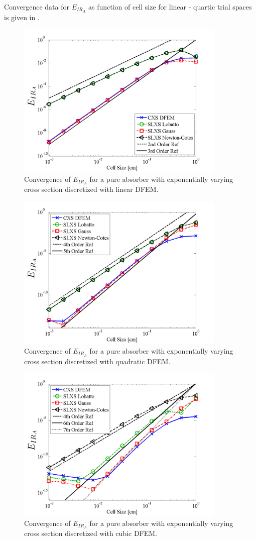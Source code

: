 Convergence data for $E_{IR_A}$ as function of cell size for linear - quartic trial spaces is given in .
%
\begin{figure}[!htp]
\centering
\includegraphics[width=10cm]{chapter3_variable_xs/P1_VarXS_E_I_A.png}
\caption{Convergence of $E_{IR_A}$ for a pure absorber with exponentially varying cross section discretized with linear DFEM.}
\label{fig:varxs_I_A_p1}
\end{figure}
%
%
\begin{figure}[!hbp]
\centering
\includegraphics[width=10cm]{chapter3_variable_xs/P2_VarXS_E_I_A.png}
\caption{Convergence of $E_{IR_A}$ for a pure absorber with exponentially varying cross section discretized with quadratic DFEM.}
\label{fig:varxs_I_A_p2}
\end{figure}
%
\begin{figure}[!htp]
\centering
\includegraphics[width=10cm]{chapter3_variable_xs/P3_VarXS_E_I_A.png}
\caption{Convergence of $E_{IR_A}$ for a pure absorber with exponentially varying cross section discretized with cubic DFEM.}
\label{fig:varxs_I_A_p3}
\end{figure}
